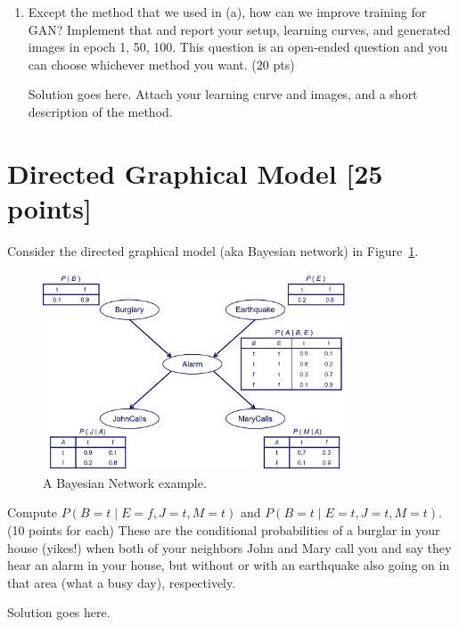 \documentclass[a4paper]{article}
\theoremstyle{definition}
\newenvironment{soln}{
	\leavevmode\color{blue}\ignorespaces
}{}
\begin{document}
\begin{enumerate} [label=(\alph*)]
	      \begin{soln}  Solution goes here. Attach your learning curve and images. \end{soln}

	\item Except the method that we used in (a), how can we improve training for GAN? Implement that and report your setup, learning curves, and generated images in epoch 1, 50, 100.
	      This question is an open-ended question and you can choose whichever method you want.
	      \hfill (20 pts)

	      \begin{soln}  Solution goes here. Attach your learning curve and images, and a short description of the method. \end{soln}

\end{enumerate}

\section{Directed Graphical Model [25 points]}
Consider the directed graphical model (aka Bayesian network) in Figure~\ref{fig:bn}.
\begin{figure}[H]
	\centering
	\includegraphics[width=0.8\textwidth]{BN.jpeg}
	\caption{A Bayesian Network example.}
	\label{fig:bn}
\end{figure}
Compute $P(B=t \mid E=f,J=t,M=t)$ and $P(B=t \mid E=t,J=t,M=t)$. (10 points for each) These are the conditional probabilities of a burglar in your house (yikes!) when both of your neighbors John and Mary call you and say they hear an alarm in your house, but without or with an earthquake also going on in that area (what a busy day), respectively.

\begin{soln}  Solution goes here. \end{soln}
\end{document}
